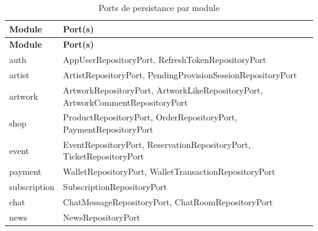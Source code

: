 \begin{longtable}{@{}ll@{}}
  \caption{Ports de persistance par module} \label{tab:ports} \\
  \toprule
  \textbf{Module} & \textbf{Port(s)} \\
  \midrule
  \endfirsthead
  \toprule
  \textbf{Module} & \textbf{Port(s)} \\
  \midrule
  \endhead
  auth & AppUserRepositoryPort, RefreshTokenRepositoryPort \\
  artist & ArtistRepositoryPort, PendingProvisionSessionRepositoryPort \\
  artwork & ArtworkRepositoryPort, ArtworkLikeRepositoryPort, ArtworkCommentRepositoryPort \\
  shop & ProductRepositoryPort, OrderRepositoryPort, PaymentRepositoryPort \\
  event & EventRepositoryPort, ReservationRepositoryPort, TicketRepositoryPort \\
  payment & WalletRepositoryPort, WalletTransactionRepositoryPort \\
  subscription & SubscriptionRepositoryPort \\
  chat & ChatMessageRepositoryPort, ChatRoomRepositoryPort \\
  news & NewsRepositoryPort \\
  \bottomrule
\end{longtable}
